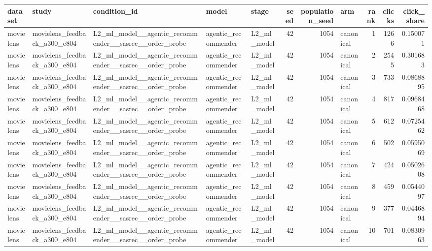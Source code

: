 \begin{table}[htbp!]
\centering
\small
\setlength{\tabcolsep}{3pt}
\renewcommand{\arraystretch}{1.1}
\begin{tabular}{lllllrrlrrr}
\hline
dataset & study & condition\_id & model & stage & seed & population\_seed & arm & rank & clicks & click\_share \\
\hline
movielens & movielens\_feedback\_a300\_e804 & L2\_ml\_model\_\_agentic\_recommender\_\_sasrec\_\_order\_probe & agentic\_recommender & L2\_ml\_model & 42 & 1054 & canonical & 1 & 1266 & 0.150071 \\
movielens & movielens\_feedback\_a300\_e804 & L2\_ml\_model\_\_agentic\_recommender\_\_sasrec\_\_order\_probe & agentic\_recommender & L2\_ml\_model & 42 & 1054 & canonical & 2 & 2545 & 0.301683 \\
movielens & movielens\_feedback\_a300\_e804 & L2\_ml\_model\_\_agentic\_recommender\_\_sasrec\_\_order\_probe & agentic\_recommender & L2\_ml\_model & 42 & 1054 & canonical & 3 & 733 & 0.0868895 \\
movielens & movielens\_feedback\_a300\_e804 & L2\_ml\_model\_\_agentic\_recommender\_\_sasrec\_\_order\_probe & agentic\_recommender & L2\_ml\_model & 42 & 1054 & canonical & 4 & 817 & 0.0968468 \\
movielens & movielens\_feedback\_a300\_e804 & L2\_ml\_model\_\_agentic\_recommender\_\_sasrec\_\_order\_probe & agentic\_recommender & L2\_ml\_model & 42 & 1054 & canonical & 5 & 612 & 0.0725462 \\
movielens & movielens\_feedback\_a300\_e804 & L2\_ml\_model\_\_agentic\_recommender\_\_sasrec\_\_order\_probe & agentic\_recommender & L2\_ml\_model & 42 & 1054 & canonical & 6 & 502 & 0.0595069 \\
movielens & movielens\_feedback\_a300\_e804 & L2\_ml\_model\_\_agentic\_recommender\_\_sasrec\_\_order\_probe & agentic\_recommender & L2\_ml\_model & 42 & 1054 & canonical & 7 & 424 & 0.0502608 \\
movielens & movielens\_feedback\_a300\_e804 & L2\_ml\_model\_\_agentic\_recommender\_\_sasrec\_\_order\_probe & agentic\_recommender & L2\_ml\_model & 42 & 1054 & canonical & 8 & 459 & 0.0544097 \\
movielens & movielens\_feedback\_a300\_e804 & L2\_ml\_model\_\_agentic\_recommender\_\_sasrec\_\_order\_probe & agentic\_recommender & L2\_ml\_model & 42 & 1054 & canonical & 9 & 377 & 0.0446894 \\
movielens & movielens\_feedback\_a300\_e804 & L2\_ml\_model\_\_agentic\_recommender\_\_sasrec\_\_order\_probe & agentic\_recommender & L2\_ml\_model & 42 & 1054 & canonical & 10 & 701 & 0.0830963 \\

\end{tabular}
\end{table}
